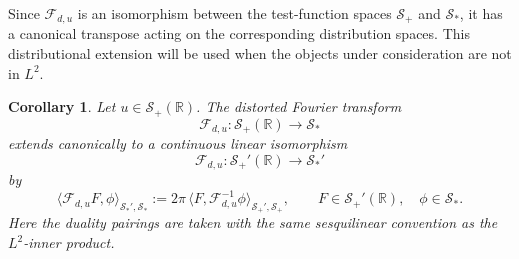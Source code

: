 \documentclass[10pt]{article}
\newtheorem{corollary}[theorem]{Corollary}
\numberwithin{equation}{section}
\numberwithin{theorem}{section}
\begin{document}
Since \(\mathcal F_{d,u}\) is an isomorphism between the test-function spaces
\(\mathcal S_+\) and \(\mathcal S_*\), it has a canonical transpose acting on the
corresponding distribution spaces. This distributional extension will be used when the
objects under consideration are not in \(L^2\).
\begin{corollary}
\label{corollary 3.7}
Let \(u\in\mathcal S_+(\mathbb R)\). The distorted Fourier transform
\[
\mathcal F_{d,u}:\mathcal S_+(\mathbb R)\to\mathcal S_*
\]
extends canonically to a continuous linear isomorphism
\[
\mathcal F_{d,u}:\mathcal S_+'(\mathbb R)\to\mathcal S_*'
\]
by
\[
\langle \mathcal F_{d,u} F,\phi\rangle_{\mathcal S_*',\mathcal S_*}
:=
2\pi\,
\langle F,\mathcal F_{d,u}^{-1}\phi\rangle_{\mathcal S_+',\mathcal S_+},
\qquad
F\in\mathcal S_+'(\mathbb R),\quad \phi\in\mathcal S_*.
\tag{3.7.1}
\]
Here the duality pairings are taken with the same sesquilinear convention as the
\(L^2\)-inner product.
\end{corollary}
\end{document}
